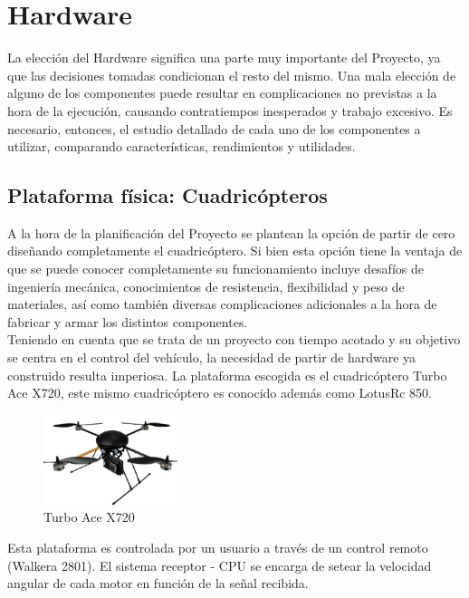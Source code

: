 \documentclass[main]{subfiles}
\begin{document}
\chapter{Hardware}
La elecci\'on del Hardware significa una parte muy importante del Proyecto, ya que las decisiones tomadas condicionan el resto del mismo. Una mala elecci\'on de alguno de los componentes puede resultar en complicaciones no previstas a la hora de la ejecuci\'on, causando contratiempos inesperados y trabajo excesivo. Es necesario, entonces, el estudio detallado de cada uno de los componentes a utilizar, comparando caracter\'isticas, rendimientos y utilidades.\\



\section{Plataforma f\'isica: Cuadric\'opteros}


A la hora de la planificaci\'on del Proyecto se plantean la opci\'on de partir de cero dise\~nando completamente el cuadric\'optero. Si bien esta opci\'on tiene la ventaja de que se puede conocer completamente su funcionamiento incluye desaf\'ios de ingenier\'ia mec\'anica, conocimientos de resistencia, flexibilidad y peso de materiales, as\'i como tambi\'en diversas complicaciones adicionales a la hora de fabricar y armar los distintos componentes. \\

Teniendo en cuenta que se trata de un proyecto con tiempo acotado y su objetivo se centra en el control del veh\'iculo, la necesidad de partir de hardware ya construido resulta imperiosa. La plataforma escogida es el cuadric\'optero Turbo Ace X720, este mismo cuadric\'optero es conocido adem\'as como LotusRc 850.\\

\begin{figure}
	\centering
	\includegraphics[width=0.35\textwidth]{./pics_eleccion_hardware/turboace.png}
	\caption{Turbo Ace X720}
	\label{fig:cuadricoptero}
\end{figure}


Esta plataforma es controlada por un usuario a trav\'es de un control remoto (Walkera 2801). El sistema receptor - CPU se encarga de setear la velocidad angular de cada motor en funci\'on de la se\~nal recibida. 
\end{document}

